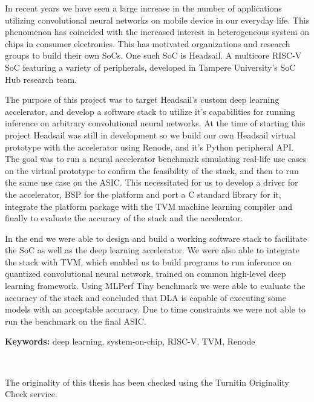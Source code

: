 \documentclass[12pt,a4paper,english
]{tunithesis}
\begin{document}
\vspace{0.5cm}


\noindent In recent years we have seen a large increase in the number of applications utilizing convolutional neural networks on mobile device in our everyday life. This phenomenon has coincided with the increased interest in heterogeneous system on chips in consumer electronics. This has motivated organizations and research groups to build their own SoCs. One such SoC is Headsail. A multicore RISC-V SoC featuring a variety of peripherals, developed in Tampere University's SoC Hub research team.

The purpose of this project was to target Headsail's custom deep learning accelerator, and develop a software stack to utilize it's capabilities for running inference on arbitrary convolutional neural networks. At the time of starting this project Headsail was still in development so we build our own Headsail virtual prototype with the accelerator using Renode, and it's Python peripheral API. The goal was to run a neural accelerator benchmark simulating real-life use cases on the virtual prototype to confirm the feasibility of the stack, and then to run the same use case on the ASIC.
This necessitated for us to develop a driver for the accelerator, BSP for the platform and port a C standard library for it, integrate the platform package with the TVM machine learning compiler and finally to evaluate the accuracy of the stack and the accelerator.

In the end we were able to design and build a working software stack to facilitate the SoC as well as the deep learning accelerator. We were also able to integrate the stack with TVM, which enabled us to build programs to run inference on quantized convolutional neural network, trained on common high-level deep learning framework. Using MLPerf Tiny benchmark we were able to evaluate the accuracy of the stack and concluded that DLA is capable of executing some models with an acceptable accuracy. Due to time constraints we were not able to run the benchmark on the final ASIC.

\noindent\textbf{Keywords:} deep learning, system-on-chip, RISC-V, TVM, Renode

~

\noindent The originality of this thesis has been checked using the Turnitin Originality Check service.
\end{document}
